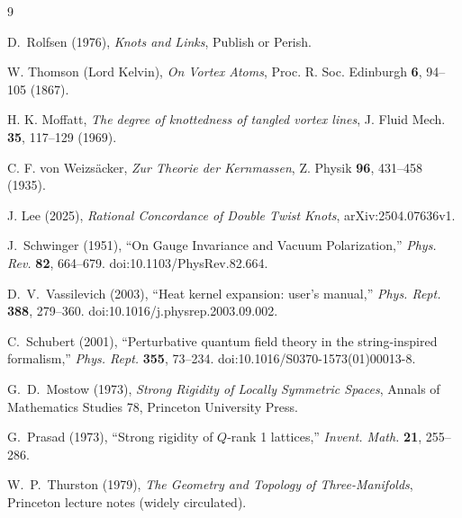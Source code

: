 \documentclass[11pt,a4paper]{article}
\begin{document}
        \begin{thebibliography}{9}

            D.~Rolfsen (1976),
            \emph{Knots and Links},
            Publish or Perish.

            W. Thomson (Lord Kelvin),
            \emph{On Vortex Atoms},
            Proc. R. Soc. Edinburgh \textbf{6}, 94--105 (1867).

            H. K. Moffatt,
            \emph{The degree of knottedness of tangled vortex lines},
            J. Fluid Mech. \textbf{35}, 117--129 (1969).

            C. F. von Weizs{\"a}cker,
            \emph{Zur Theorie der Kernmassen},
            Z. Physik \textbf{96}, 431--458 (1935).

            J. Lee (2025),
            \emph{Rational Concordance of Double Twist Knots},
            arXiv:2504.07636v1.

                J.~Schwinger (1951),
                ``On Gauge Invariance and Vacuum Polarization,''
                \emph{Phys. Rev.} \textbf{82}, 664--679.
                doi:10.1103/PhysRev.82.664.

                D.~V.~Vassilevich (2003),
                ``Heat kernel expansion: user’s manual,''
                \emph{Phys. Rept.} \textbf{388}, 279--360.
                doi:10.1016/j.physrep.2003.09.002.

                C.~Schubert (2001),
                ``Perturbative quantum field theory in the string-inspired formalism,''
                \emph{Phys. Rept.} \textbf{355}, 73--234.
                doi:10.1016/S0370-1573(01)00013-8.

                G.~D.~Mostow (1973),
                \emph{Strong Rigidity of Locally Symmetric Spaces},
                Annals of Mathematics Studies 78, Princeton University Press.

                G.~Prasad (1973),
                ``Strong rigidity of $Q$-rank 1 lattices,''
                \emph{Invent. Math.} \textbf{21}, 255--286.

                W.~P.~Thurston (1979),
                \emph{The Geometry and Topology of Three-Manifolds},
                Princeton lecture notes (widely circulated).


\end{thebibliography}
\end{document}
